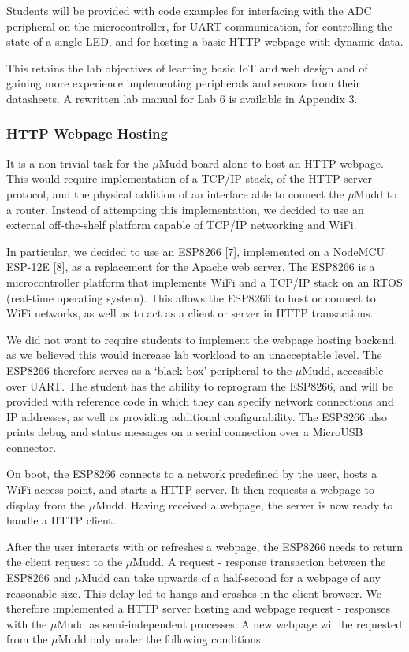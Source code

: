 \documentclass[12pt]{article}
\begin{document}
Students will be provided with code examples for interfacing with the ADC peripheral on the microcontroller, for UART communication, for controlling the state of a single LED, and for hosting a basic HTTP webpage with dynamic data.

This retains the lab objectives of learning basic IoT and web design and of gaining more experience implementing peripherals and sensors from their datasheets. A rewritten lab manual for Lab 6 is available in Appendix 3.

\subsubsection{HTTP Webpage Hosting}

It is a non-trivial task for the $\mu$Mudd board alone to host an HTTP webpage. This would require implementation of a TCP/IP stack, of the HTTP server protocol, and the physical addition of an interface able to connect the $\mu$Mudd to a router. Instead of attempting this implementation, we decided to use an external off-the-shelf platform capable of TCP/IP networking and WiFi. 

In particular, we decided to use an ESP8266 [7], implemented on a NodeMCU ESP-12E [8], as a replacement for the Apache web server. The ESP8266 is a microcontroller platform that implements WiFi and a TCP/IP stack on an RTOS (real-time operating system). This allows the ESP8266 to host or connect to WiFi networks, as well as to act as a client or server in HTTP transactions.

We did not want to require students to implement the webpage hosting backend, as we believed this would increase lab workload to an unacceptable level. The ESP8266 therefore serves as a `black box' peripheral to the $\mu$Mudd, accessible over UART. The student has the ability to reprogram the ESP8266, and will be provided with reference code in which they can specify network connections and IP addresses, as well as providing additional configurability. The ESP8266 also prints debug and status messages on a serial connection over a MicroUSB connector.

On boot, the ESP8266 connects to a network predefined by the user, hosts a WiFi access point, and starts a HTTP server. It then requests a webpage to display from the $\mu$Mudd. Having received a webpage, the server is now ready to handle a HTTP client. 

After the user interacts with or refreshes a webpage, the ESP8266 needs to return the client request to the $\mu$Mudd. A request - response transaction between the ESP8266 and $\mu$Mudd can take upwards of a half-second for a webpage of any reasonable size. This delay led to hangs and crashes in the client browser. We therefore implemented a HTTP server hosting and webpage request - responses with the $\mu$Mudd as semi-independent processes. A new webpage will be requested from the $\mu$Mudd only under the following conditions:
\end{document}
